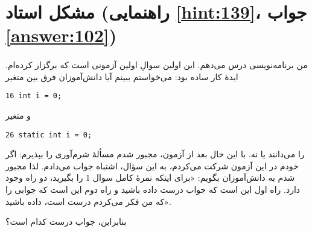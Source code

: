\section[مشکل استاد]{مشکل استاد \protect{} (راهنمایی \ref{hint:139}، جواب \ref{answer:102})}
\paragraph{}\label{prog:2}
من برنامه‌نویسی  درس می‌دهم. این اولین سوالِ اولین آزمونی است که برگزار کرده‌ام. ایدهٔ کار ساده بود: می‌خواستم ببینم آیا دانش‌آموزان فرق بین متغیر 
\begin{LTR}
            \begin{lstlisting}[style=C++Style]
                16 int i = 0;
            \end{lstlisting}
\end{LTR}
و متغیر 
\begin{LTR}
            \begin{lstlisting}[style=C++Style]
                26 static int i = 0;
            \end{lstlisting}
\end{LTR}
را می‌دانند یا نه. با این حال بعد از آزمون، مجبور شدم مسألهٔ شرم‌آوری را بپذیرم: اگر خودم در این آزمون شرکت می‌کردم، به این سؤال، اشتباه جواب می‌دادم. لذا مجبور شدم به دانش‌آموزان بگویم: «برای اینکه نمرهٔ کامل سوال 1 را بگیرید، دو راه وجود دارد. راه اول این است که جواب درست داده باشید و راه دوم این است که جوابی را که من فکر می‌کردم درست است، داده باشید».

بنابراین، جواب درست کدام است؟

